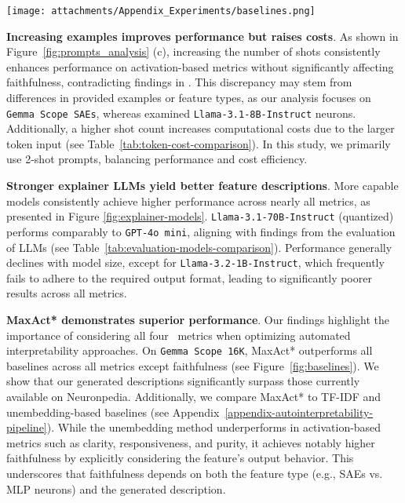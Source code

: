 \begin{figure*}[t]
    \centering
    \texttt{[image: attachments/Appendix\_Experiments/baselines.png]}
    \caption{MaxAct* comparison to feature descriptions, generated via other methods on \texttt{Gemma Scope 16K} and \texttt{Llama3.1-8B-Instruct}.}
    \label{fig:baselines}
\end{figure*}

\textbf{Increasing examples improves performance but raises costs}. As shown in Figure~\ref{fig:prompts_analysis} (c), increasing the number of shots consistently enhances performance on activation-based metrics without significantly affecting faithfulness, contradicting findings in \cite{choi2024automatic}. This discrepancy may stem from differences in provided examples or feature types, as our analysis focuses on \texttt{Gemma Scope SAEs}, whereas \cite{choi2024automatic} examined \texttt{Llama-3.1-8B-Instruct} neurons. Additionally, a higher shot count increases computational costs due to the larger token input (see Table~\ref{tab:token-cost-comparison}). In this study, we primarily use 2-shot prompts, balancing performance and cost efficiency.

\textbf{Stronger explainer LLMs yield better feature descriptions}. More capable models consistently achieve higher performance across nearly all metrics, as presented in Figure \ref{fig:explainer-models}. \texttt{Llama-3.1-70B-Instruct} (quantized) performs comparably to \texttt{GPT-4o mini}, aligning with findings from the evaluation of LLMs (see Table~\ref{tab:evaluation-models-comparison}). Performance generally declines with model size, except for \texttt{Llama-3.2-1B-Instruct}, which frequently fails to adhere to the required output format, leading to significantly poorer results across all metrics.

\textbf{MaxAct* demonstrates superior performance}. Our findings highlight the importance of considering all four \ours\ metrics when optimizing automated interpretability approaches. On \texttt{Gemma Scope 16K}, MaxAct* outperforms all baselines across all metrics except faithfulness (see Figure~\ref{fig:baselines}). We show that our generated descriptions significantly surpass those currently available on Neuronpedia. Additionally, we compare MaxAct* to TF-IDF and unembedding-based baselines (see Appendix~\ref{appendix-autointerpretability-pipeline}). While the unembedding method underperforms in activation-based metrics such as clarity, responsiveness, and purity, it achieves notably higher faithfulness by explicitly considering the feature’s output behavior. This underscores that faithfulness depends on both the feature type (e.g., SAEs vs. MLP neurons) and the generated description.


